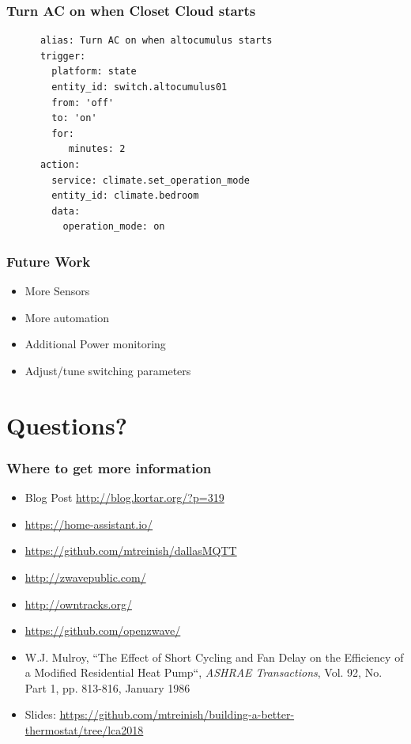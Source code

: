 \documentclass[aspectratio=169,11pt,hyperref={colorlinks=true}]{beamer}
\begin{document}
\begin{frame}[fragile=singleslide]
    \frametitle{Turn AC on when Closet Cloud starts}
    \begin{verbatim}
      alias: Turn AC on when altocumulus starts
      trigger:
        platform: state
        entity_id: switch.altocumulus01
        from: 'off'
        to: 'on'
        for:
           minutes: 2
      action:
        service: climate.set_operation_mode
        entity_id: climate.bedroom
        data:
          operation_mode: on
    \end{verbatim}
\end{frame}

\begin{frame}
    \frametitle{Future Work}
    \begin{itemize}
        \item More Sensors
        \item More automation
        \item Additional Power monitoring
        \item Adjust/tune switching parameters
    \end{itemize}
\end{frame}

\section{Questions?}
\begin{frame}
\frametitle{Where to get more information}
    \begin{itemize}
        \item Blog Post \href{http://blog.kortar.org/?p=319}{http://blog.kortar.org/?p=319}
        \item \href{https://home-assistant.io/}{https://home-assistant.io/}
        \item \href{https://github.com/mtreinish/dallasMQTT}{https://github.com/mtreinish/dallasMQTT}
        \item \href{http://zwavepublic.com/}{http://zwavepublic.com/}
        \item \href{http://owntracks.org/}{http://owntracks.org/}
        \item \href{https://github.com/openzwave/}{https://github.com/openzwave/}
        \item W.J. Mulroy, ``The Effect of Short Cycling and Fan Delay on the Efficiency of a Modified Residential Heat Pump``, \textit{ASHRAE Transactions}, Vol. 92, No. Part 1, pp. 813-816, January 1986
        \item Slides: \href{https://github.com/mtreinish/building-a-better-thermostat/tree/lca2018}{https://github.com/mtreinish/building-a-better-thermostat/tree/lca2018}
    \end{itemize}
\end{frame}
\end{document}
